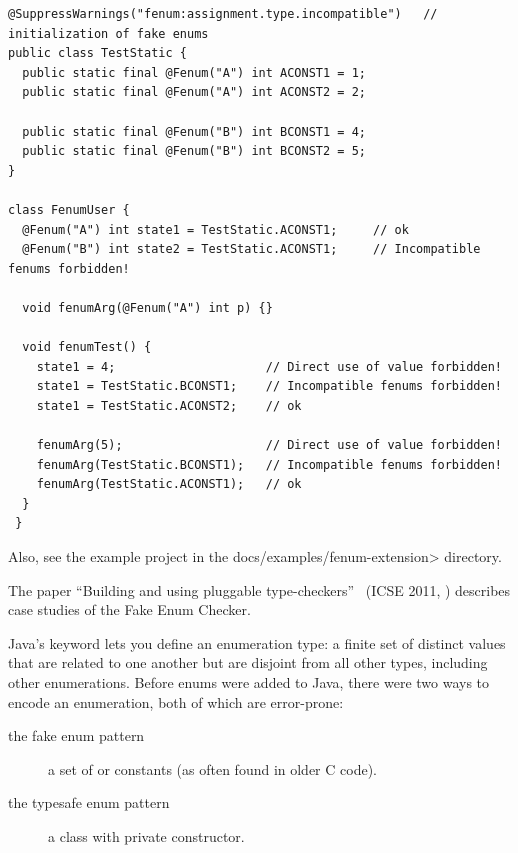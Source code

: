 \begin{Verbatim}
@SuppressWarnings("fenum:assignment.type.incompatible")   // initialization of fake enums
public class TestStatic {
  public static final @Fenum("A") int ACONST1 = 1;
  public static final @Fenum("A") int ACONST2 = 2;

  public static final @Fenum("B") int BCONST1 = 4;
  public static final @Fenum("B") int BCONST2 = 5;
}

class FenumUser {
  @Fenum("A") int state1 = TestStatic.ACONST1;     // ok
  @Fenum("B") int state2 = TestStatic.ACONST1;     // Incompatible fenums forbidden!

  void fenumArg(@Fenum("A") int p) {}

  void fenumTest() {
    state1 = 4;                     // Direct use of value forbidden!
    state1 = TestStatic.BCONST1;    // Incompatible fenums forbidden!
    state1 = TestStatic.ACONST2;    // ok

    fenumArg(5);                    // Direct use of value forbidden!
    fenumArg(TestStatic.BCONST1);   // Incompatible fenums forbidden!
    fenumArg(TestStatic.ACONST1);   // ok
  }
 }
\end{Verbatim}

Also, see the example project in the \<docs/examples/fenum-extension> directory.

The paper ``Building and using pluggable
type-checkers''~\cite{DietlDEMS2011} (ICSE 2011,
)
describes case studies of the Fake Enum Checker.



Java's
\href{https://docs.oracle.com/javase/specs/jls/se17/html/jls-8.html#jls-8.9}{}
keyword lets you define an enumeration type: a finite set of distinct values
that are related to one another but are disjoint from all other
types, including other enumerations.
Before enums were added to Java, there were two ways to encode an
enumeration, both of which are error-prone:

\begin{description}
\item[the fake enum pattern]  a set of  or 
  constants (as often found in older C code).

\item[the typesafe enum pattern]  a class with private constructor.
\end{description}

